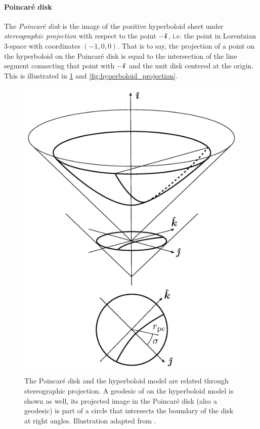 \paragraph{Poincaré disk} The \emph{Poincaré disk} is the image of the positive hyperboloid sheet under \emph{stereographic projection} with respect to the point $-\quati$, i.e. the point in Lorentzian 3-space with coordinates $(-1, 0, 0)$. That is to say, the projection of a point on the hyperboloid on the Poincaré disk is equal to the intersection of the line segment connecting that point with $-\quati$ and the unit disk centered at the origin. This is illustrated in \cref{fig:poincare_disk} and \cref{fig:hyperboloid_projection}. 
\begin{figure}[ht!]
    \centering
    \includegraphics[scale=1]{media/other/poincare_disk-eps-converted-to}
    \caption{The Poincaré disk and the hyperboloid model are related through stereographic projection. A geodesic of on the hyperboloid model is shown as well, its projected image in the Poincaré disk (also a geodesic) is part of a circle that intersects the boundary of the disk at right angles. Illustration adapted from \citet{Balazs1986}.}
    \label{fig:poincare_disk}
\end{figure}

